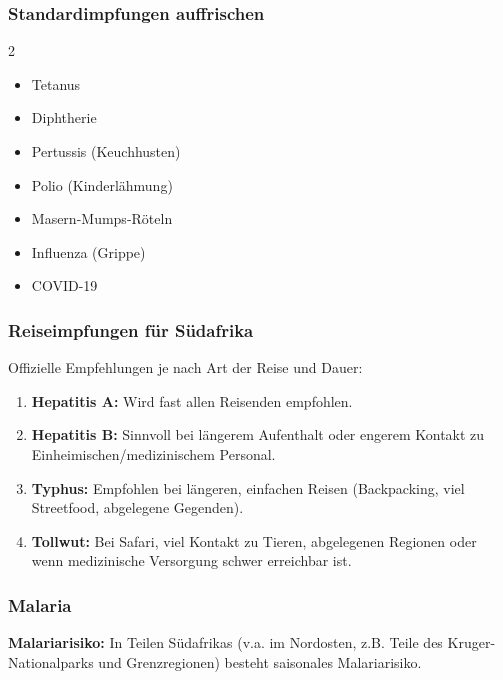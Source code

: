 \documentclass[12pt,a4paper]{article}
\begin{document}
\subsubsection{Standardimpfungen auffrischen}

\begin{purplebox}
\begin{multicols}{2}
\begin{itemize}[leftmargin=*,label={\color{deeppurple}\faSyringe}]
    \item Tetanus
    \item Diphtherie
    \item Pertussis (Keuchhusten)
    \item Polio (Kinderlähmung)
    \item Masern-Mumps-Röteln
    \item Influenza (Grippe)
    \item COVID-19
\end{itemize}
\end{multicols}
\end{purplebox}

\subsubsection{Reiseimpfungen für Südafrika}

Offizielle Empfehlungen je nach Art der Reise und Dauer:\cite{osir-3}

\begin{enumerate}[leftmargin=*,label={\color{mainblue}\bfseries\arabic*.}]
    \item \textbf{Hepatitis A:} Wird fast allen Reisenden empfohlen.
    \item \textbf{Hepatitis B:} Sinnvoll bei längerem Aufenthalt oder engerem Kontakt zu Einheimischen/medizinischem Personal.
    \item \textbf{Typhus:} Empfohlen bei längeren, einfachen Reisen (Backpacking, viel Streetfood, abgelegene Gegenden).
    \item \textbf{Tollwut:} Bei Safari, viel Kontakt zu Tieren, abgelegenen Regionen oder wenn medizinische Versorgung schwer erreichbar ist.
\end{enumerate}

\subsubsection{Malaria}

\begin{warnbox}
\textbf{\faBug \hspace{0.2cm} Malariarisiko:} In Teilen Südafrikas (v.a. im Nordosten, z.B. Teile des Kruger-Nationalparks und Grenzregionen) besteht saisonales Malariarisiko.\cite{adac-gesundheit-2}
\end{warnbox}
\end{document}
